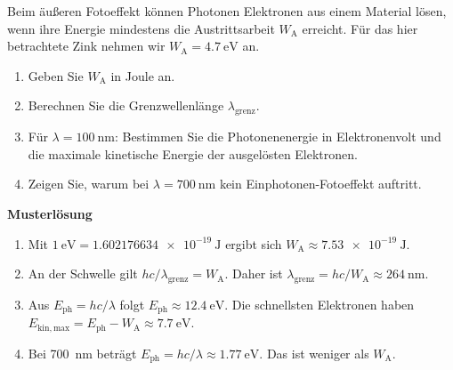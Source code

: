 \begin{ExerciseBlock}
Beim äußeren Fotoeffekt können Photonen Elektronen aus einem Material lösen, wenn ihre Energie mindestens die Austrittsarbeit $W_\mathrm A$ erreicht. Für das hier betrachtete Zink nehmen wir $W_\mathrm A=\qty{4.7}{\electronvolt}$ an.
\begin{enumerate}
\item Geben Sie $W_\mathrm A$ in Joule an.
\item Berechnen Sie die Grenzwellenlänge $\lambda_\mathrm{grenz}$.
\item Für $\lambda=\qty{100}{\nano\metre}$: Bestimmen Sie die Photonenenergie in Elektronenvolt und die maximale kinetische Energie der ausgelösten Elektronen.
\item Zeigen Sie, warum bei $\lambda=\qty{700}{\nano\metre}$ kein Einphotonen-Fotoeffekt auftritt.
\end{enumerate}
\end{ExerciseBlock}
\begin{Solution}
\par\medskip\noindent\textbf{Musterlösung}\par\nopagebreak[4]
\begin{enumerate}
\item Mit $\qty{1}{\electronvolt}=\qty{1.602176634e-19}{\joule}$ ergibt sich $W_\mathrm A\approx\qty{7.53e-19}{\joule}$.
\item An der Schwelle gilt $hc/\lambda_\mathrm{grenz}=W_\mathrm A$. Daher ist $\lambda_\mathrm{grenz}=hc/W_\mathrm A\approx\qty{264}{\nano\metre}$.
\item Aus $E_\mathrm{ph}=hc/\lambda$ folgt $E_\mathrm{ph}\approx\qty{12.4}{\electronvolt}$. Die schnellsten Elektronen haben $E_{\mathrm{kin,max}}=E_\mathrm{ph}-W_\mathrm A\approx\qty{7.7}{\electronvolt}$.
\item Bei \qty{700}{\nano\metre} beträgt $E_\mathrm{ph}=hc/\lambda\approx\qty{1.77}{\electronvolt}$. Das ist weniger als $W_\mathrm A$.
\end{enumerate}
\end{Solution}
